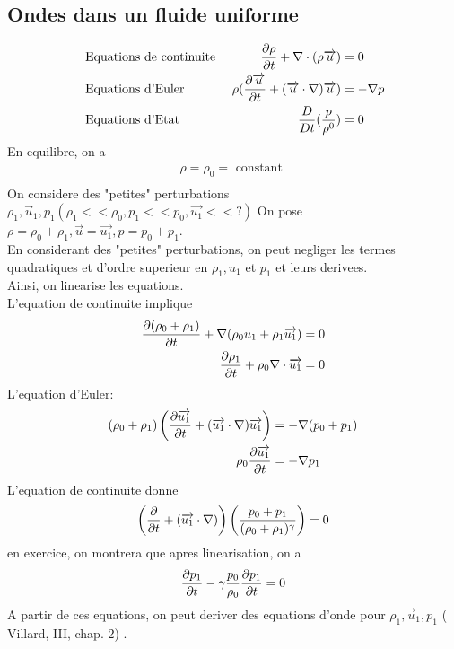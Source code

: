\documentclass[../main.tex]{subfiles}
\begin{document}
\begin{exemple}
\subsection{Ondes dans un fluide uniforme}
\begin{align*}
	&\text{ Equations de continuite } 	&\frac{\partial \rho}{\partial t} + \nabla \cdot( \rho \overrightarrow{u} ) &=0\\
	&\text{ Equations d'Euler } & \rho ( \frac{\partial \overrightarrow{u}}{\partial t} + ( \overrightarrow{u} \cdot \nabla) \overrightarrow{u}) &= - \nabla p\\
	&\text{ Equations d'Etat } & \frac{D}{Dt}( \frac{p}{\rho ^{0}})  &=0
\end{align*}
En equilibre, on a 
\begin{align*}
\rho = \rho_0 = \text{ constant } \\
\end{align*}
On considere des "petites" perturbations $\rho_1, \vec{u}_1, p_1 ( \rho_1 << \rho_0, p_1 << p_0, \vec{u_1} << ?) $
On pose $ \rho = \rho_0 + \rho_1, \vec{u}= \vec{u_1}, p= p_0+p_1$.\\
En considerant des "petites" perturbations, on peut negliger les termes quadratiques et d'ordre superieur en $\rho_1, u_1$ et $p_1$ et leurs derivees.\\
Ainsi, on linearise les equations.\\
L'equation de continuite implique
\begin{align*}
	\frac{\partial ( \rho_0 + \rho_1) }{\partial t} + \nabla ( \rho_0 u_1 + \rho_1 \overrightarrow{u_1}) &=0\\
	\frac{\partial \rho_1}{\partial t} + \rho_0 \nabla \cdot \overrightarrow{u_1} &= 0
\end{align*}
L'equation d'Euler:
\begin{align*}
	( \rho_{0} + \rho_{1}  ) \left( \frac{\partial \overrightarrow{u_1}}{\partial t} + ( \overrightarrow{u_1} \cdot \nabla ) \overrightarrow{u_1} \right) &= - \nabla (  p_0 + p_1) \\
	\rho_0 \frac{\partial \overrightarrow{u_1}}{\partial t} &= - \nabla p_1
\end{align*}
L'equation de continuite donne
\begin{align*}
	\left( \frac{\partial }{\partial t} + ( \overrightarrow{u_1} \cdot\nabla)  \right) \left( \frac{p_0 + p_1}{( \rho_0 + \rho_1) ^{\gamma}} \right) =0
\end{align*}
en exercice, on montrera que apres linearisation, on a
\begin{align*}
\frac{\partial p_1}{\partial t} - \gamma \frac{p_0}{\rho_0} \frac{\partial p_1}{\partial t} =0			
\end{align*}
A partir de ces equations, on peut deriver des equations d'onde pour $\rho_1, \vec{u}_1, p_1$ ( Villard, III, chap. 2) .\\

\end{exemple}
\end{document}
